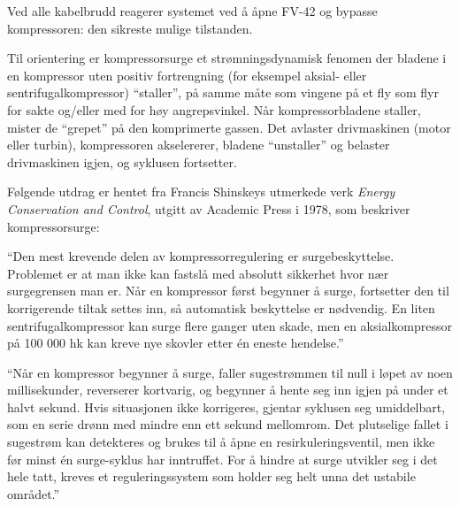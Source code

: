 





Ved alle kabelbrudd reagerer systemet ved å åpne FV-42 og bypasse kompressoren: den sikreste mulige tilstanden.

\vskip 10pt

Til orientering er kompressorsurge et strømningsdynamisk fenomen der bladene i en kompressor uten positiv fortrengning (for eksempel aksial- eller sentrifugalkompressor) ``staller'', på samme måte som vingene på et fly som flyr for sakte og/eller med for høy angrepsvinkel. Når kompressorbladene staller, mister de ``grepet'' på den komprimerte gassen. Det avlaster drivmaskinen (motor eller turbin), kompressoren akselererer, bladene ``unstaller'' og belaster drivmaskinen igjen, og syklusen fortsetter.

Følgende utdrag er hentet fra Francis Shinskeys utmerkede verk {\it Energy Conservation and Control}, utgitt av Academic Press i 1978, som beskriver kompressorsurge:

\vskip 10pt {\narrower \noindent \baselineskip5pt

``Den mest krevende delen av kompressorregulering er surgebeskyttelse. Problemet er at man ikke kan fastslå med absolutt sikkerhet hvor nær surgegrensen man er. Når en kompressor først begynner å surge, fortsetter den til korrigerende tiltak settes inn, så automatisk beskyttelse er nødvendig. En liten sentrifugalkompressor kan surge flere ganger uten skade, men en aksialkompressor på 100 000 hk kan kreve nye skovler etter én eneste hendelse.''

\vskip 5pt

``Når en kompressor begynner å surge, faller sugestrømmen til null i løpet av noen millisekunder, reverserer kortvarig, og begynner å hente seg inn igjen på under et halvt sekund. Hvis situasjonen ikke korrigeres, gjentar syklusen seg umiddelbart, som en serie drønn med mindre enn ett sekund mellomrom. Det plutselige fallet i sugestrøm kan detekteres og brukes til å åpne en resirkuleringsventil, men ikke før minst én surge-syklus har inntruffet. For å hindre at surge utvikler seg i det hele tatt, kreves et reguleringssystem som holder seg helt unna det ustabile området.''

\par} \vskip 10pt







